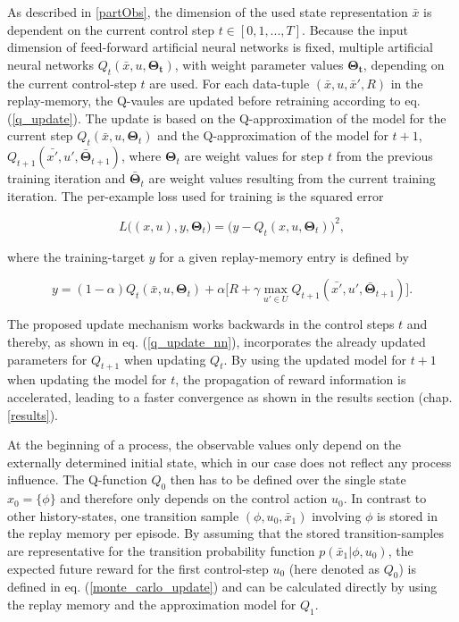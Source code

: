 As described in \ref{partObs}, the dimension of the used state representation $\bar{x}$ is dependent on the current control step $t\in[0, 1, ..., T]$. Because the input dimension of feed-forward artificial neural networks is fixed, multiple artificial neural networks $Q_t(\bar{x}, u, \bm{\Theta_t})$, with weight parameter values $\bm{\Theta_t}$, depending on the current control-step $t$ are used. For each data-tuple $(\bar{x}, u, \bar{x}', R)$ in the replay-memory, the Q-vaules are updated before retraining according to eq. (\ref{q_update}). The update is based on the Q-approximation of the model for the current step \allowbreak$Q_t(\bar{x}, u, \bm{\Theta}_{t})$ and the Q-approximation of the model for $t+1$, \allowbreak$Q_{t+1}(\bar{x'},u', \bm{\bar\Theta}_{t+1})$, where $\bm{\Theta}_t$ are weight values for step $t$ from the previous training iteration and $\bm{\bar\Theta}_t$ are weight values resulting from the current training iteration. The per-example loss used for training is the squared error

\begin{equation}
\label{loss}
L\big((x,u),y,\bm{\Theta}_t\big)=\big(y-Q_t(x,u,\bm{\Theta}_t)\big)^2,
\end{equation}

where the training-target $y$ for a given replay-memory entry is defined by 

\begin{equation}
\label{q_update_nn}
y=(1-\alpha)Q_t(\bar{x},u, \bm{\Theta}_{t})+ \alpha\Big[R+\gamma\max\limits_{u'\in U}Q_{t+1}(\bar{x'},u', \bm{\bar\Theta}_{t+1})\Big].
\end{equation}

The proposed update mechanism works backwards in the control steps $t$ and thereby, as shown in eq. (\ref{q_update_nn}), incorporates the already updated parameters for $Q_{t+1}$ when updating $Q_{t}$. By using the updated model for $t+1$ when updating the model for $t$, the propagation of reward information is accelerated, leading to a faster convergence as shown in the results section (chap. \ref{results}). 

At the beginning of a process, the observable values only depend on the externally determined initial state, which in our case does not reflect any process influence. The Q-function $Q_0$ then has to be defined over the single state $x_0=\{\phi\}$ and therefore only depends on the control action $u_0$. In contrast to other history-states, one transition sample $(\phi, u_0, \bar{x}_1)$ involving $\phi$ is stored in the replay memory per episode. By assuming that the stored transition-samples are representative for the transition probability function $p(\bar{x}_1|\phi, u_0)$, the expected future reward for the first control-step $u_0$ (here denoted as $Q_0$) is defined in eq. (\ref{monte_carlo_update}) and can be calculated directly by using the replay memory and the approximation model for $Q_1$.
 
